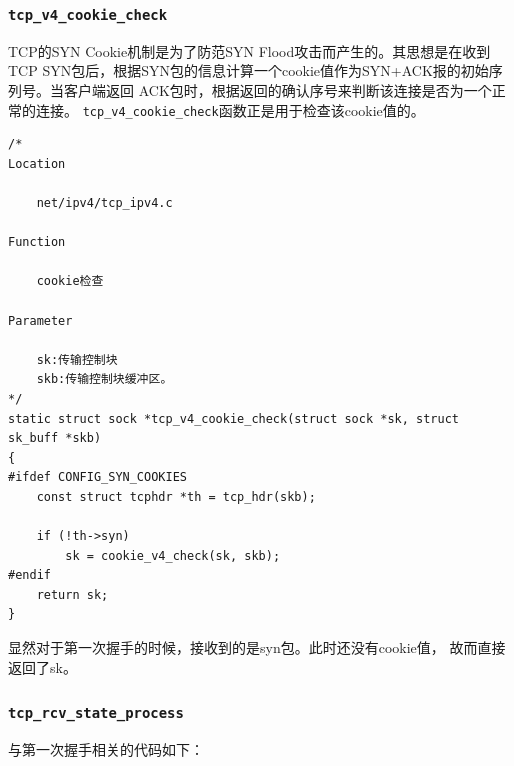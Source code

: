             \subsubsection{\texttt{tcp_v4_cookie_check}}
                TCP的SYN Cookie机制是为了防范SYN Flood攻击而产生的。其思想是在收到
TCP SYN包后，根据SYN包的信息计算一个cookie值作为SYN+ACK报的初始序列号。当客户端返回
ACK包时，根据返回的确认序号来判断该连接是否为一个正常的连接。
\texttt{tcp_v4_cookie_check}函数正是用于检查该cookie值的。
\begin{verbatim}
/*
Location

    net/ipv4/tcp_ipv4.c

Function

    cookie检查

Parameter

    sk:传输控制块
    skb:传输控制块缓冲区。  
*/
static struct sock *tcp_v4_cookie_check(struct sock *sk, struct sk_buff *skb)
{
#ifdef CONFIG_SYN_COOKIES
    const struct tcphdr *th = tcp_hdr(skb);

    if (!th->syn)
        sk = cookie_v4_check(sk, skb);
#endif
    return sk;
}
\end{verbatim}

                显然对于第一次握手的时候，接收到的是syn包。此时还没有cookie值，
故而直接返回了sk。
            \subsubsection{\texttt{tcp_rcv_state_process}}
                \label{Server:tcp_rcv_state_process}
                与第一次握手相关的代码如下：

